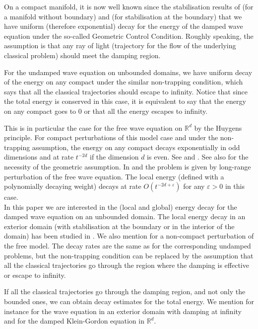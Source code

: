 \documentclass[10pt, a4paper,reqno]{amsart}
\theoremstyle{plain}
\theoremstyle{definition}
\theoremstyle{remark}
\begin{document}
On a compact manifold, it is now well known since the stabilisation results of \cite{raucht74} (for a manifold without boundary) and \cite{bardoslr92} (for stabilisation at the boundary) that we have uniform (therefore exponential) decay for the energy of the damped wave equation under the so-called Geometric Control Condition. Roughly speaking, the assumption is that any ray of light (trajectory for the flow of the underlying classical problem) should meet the damping region.

For the undamped wave equation on unbounded domains, we have uniform decay of the energy on any compact under the similar non-trapping condition, which says that all the classical trajectories should escape to infinity. Notice that since the total energy is conserved in this case, it is equivalent to say that the energy on any compact goes to 0 or that all the energy escapes to infinity.

This is in particular the case for the free wave equation on ${\mathbb{R}}^d$ by the Huygens principle. 
For compact perturbations of this model case and under the non-trapping assumption, the energy on any compact decays exponentially in odd dimensions and at rate $t^{-2d}$ if the dimension $d$ is even. See \cite{morawetzrs77} and \cite{melrose79}. See also \cite{ralston69} for the necessity of the geometric assumption. In \cite{bonyh12} and \cite{bouclet11} the problem is given by long-range perturbation of the free wave equation. The local energy (defined with a polynomially decaying weight) decays at rate $O(t^{-2d + {\varepsilon}})$ for any ${\varepsilon} > 0$ in this case.\\

In this paper we are interested in the (local and global) energy decay for the damped wave equation on an unbounded domain. The local energy decay in an exterior domain (with stabilisation at the boundary or in the interior of the domain) has been studied in \cite{alouik02,khenissi03}. We also mention \cite{boucletr14,royer-dld-energy-space} for a non-compact perturbation of the free model. The decay rates are the same as for the corresponding undamped problems, but the non-trapping condition can be replaced by the assumption that all the classical trajectories go through the region where the damping is effective or escape to infinity. 

If all the classical trajectories go through the damping region, and not only the bounded ones, we can obtain decay estimates for the total energy. We mention for instance \cite{AlouiIbKh15} for the wave equation in an exterior domain with damping at infinity and \cite{BurqJo} for the damped Klein-Gordon equation in ${\mathbb{R}}^d$.\\ 
\end{document}
